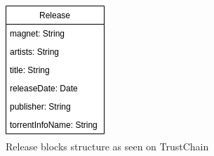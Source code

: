 \begin{figure}
        \includegraphics[width=\linewidth]{implementation/release-implementation.png}
        \caption{Release blocks structure as seen on TrustChain}
        \label{fig:release-implementation}
    \endminipage\hfill

\end{figure}
